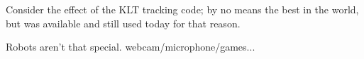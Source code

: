 

%
Consider the effect of the KLT tracking code; by no means
the best in the world, but was available and still used
today for that reason.



Robots aren't that special.  webcam/microphone/games...

